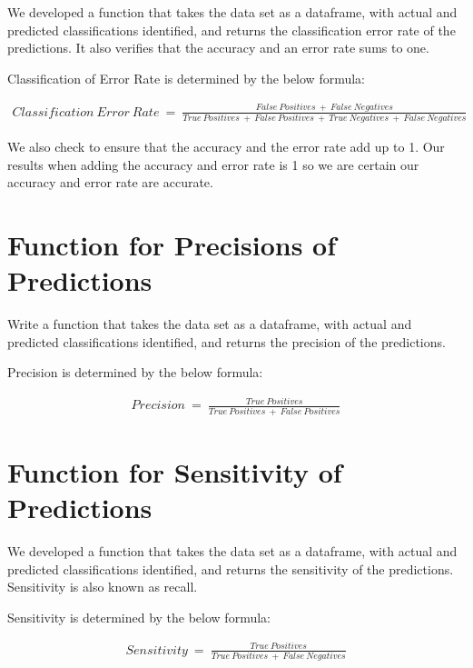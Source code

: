 \documentclass[]{article}
\begin{document}
We developed a function that takes the data set as a dataframe, with
actual and predicted classifications identified, and returns the
classification error rate of the predictions. It also verifies that the
accuracy and an error rate sums to one.

Classification of Error Rate is determined by the below formula:

\[
\begin{aligned}
Classification~Error~Rate~=~\frac{False~Positives~+~False~Negatives}{True~Positives~+~False~Positives~+~True~Negatives~+~False~Negatives}
\end{aligned}
\]

We also check to ensure that the accuracy and the error rate add up to
1. Our results when adding the accuracy and error rate is 1 so we are
certain our accuracy and error rate are accurate.

\section{Function for Precisions of
Predictions}\label{function-for-precisions-of-predictions}

Write a function that takes the data set as a dataframe, with actual and
predicted classifications identified, and returns the precision of the
predictions.

Precision is determined by the below formula:

\[
\begin{aligned}
Precision~=~\frac{True~Positives}{True~Positives~+~False~Positives}
\end{aligned}
\]

\section{Function for Sensitivity of
Predictions}\label{function-for-sensitivity-of-predictions}

We developed a function that takes the data set as a dataframe, with
actual and predicted classifications identified, and returns the
sensitivity of the predictions. Sensitivity is also known as recall.

Sensitivity is determined by the below formula:

\[
\begin{aligned}
Sensitivity~=~\frac{True~Positives}{True~Positives~+~False~Negatives}
\end{aligned}
\]

\newpage
\end{document}
